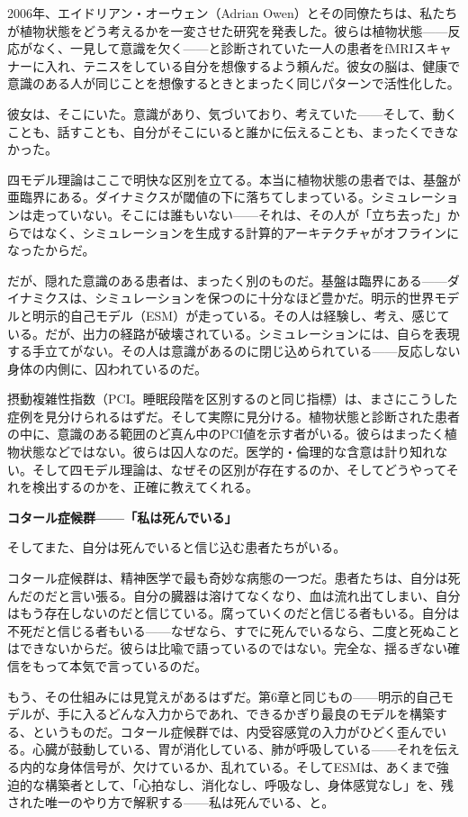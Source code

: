 \documentclass[11pt, twoside, openright]{book}
\begin{document}
2006年、エイドリアン・オーウェン（Adrian Owen）とその同僚たちは、私たちが植物状態をどう考えるかを一変させた研究を発表した。彼らは植物状態------反応がなく、一見して意識を欠く------と診断されていた一人の患者をfMRIスキャナーに入れ、テニスをしている自分を想像するよう頼んだ。彼女の脳は、健康で意識のある人が同じことを想像するときとまったく同じパターンで活性化した。

彼女は、そこにいた。意識があり、気づいており、考えていた------そして、動くことも、話すことも、自分がそこにいると誰かに伝えることも、まったくできなかった。

四モデル理論はここで明快な区別を立てる。本当に植物状態の患者では、基盤が亜臨界にある。ダイナミクスが閾値の下に落ちてしまっている。シミュレーションは走っていない。そこには誰もいない------それは、その人が「立ち去った」からではなく、シミュレーションを生成する計算的アーキテクチャがオフラインになったからだ。

だが、隠れた意識のある患者は、まったく別のものだ。基盤は臨界にある------ダイナミクスは、シミュレーションを保つのに十分なほど豊かだ。明示的世界モデルと明示的自己モデル（ESM）が走っている。その人は経験し、考え、感じている。だが、出力の経路が破壊されている。シミュレーションには、自らを表現する手立てがない。その人は意識があるのに閉じ込められている------反応しない身体の内側に、囚われているのだ。

摂動複雑性指数（PCI。睡眠段階を区別するのと同じ指標）は、まさにこうした症例を見分けられるはずだ。そして実際に見分ける。植物状態と診断された患者の中に、意識のある範囲のど真ん中のPCI値を示す者がいる。彼らはまったく植物状態などではない。彼らは囚人なのだ。医学的・倫理的な含意は計り知れない。そして四モデル理論は、なぜその区別が存在するのか、そしてどうやってそれを検出するのかを、正確に教えてくれる。

\textbf{コタール症候群------「私は死んでいる」}

そしてまた、自分は死んでいると信じ込む患者たちがいる。

コタール症候群は、精神医学で最も奇妙な病態の一つだ。患者たちは、自分は死んだのだと言い張る。自分の臓器は溶けてなくなり、血は流れ出てしまい、自分はもう存在しないのだと信じている。腐っていくのだと信じる者もいる。自分は不死だと信じる者もいる------なぜなら、すでに死んでいるなら、二度と死ぬことはできないからだ。彼らは比喩で語っているのではない。完全な、揺るぎない確信をもって本気で言っているのだ。

もう、その仕組みには見覚えがあるはずだ。第6章と同じもの------明示的自己モデルが、手に入るどんな入力からであれ、できるかぎり最良のモデルを構築する、というものだ。コタール症候群では、内受容感覚の入力がひどく歪んでいる。心臓が鼓動している、胃が消化している、肺が呼吸している------それを伝える内的な身体信号が、欠けているか、乱れている。そしてESMは、あくまで強迫的な構築者として、「心拍なし、消化なし、呼吸なし、身体感覚なし」を、残された唯一のやり方で解釈する------私は死んでいる、と。
\end{document}
